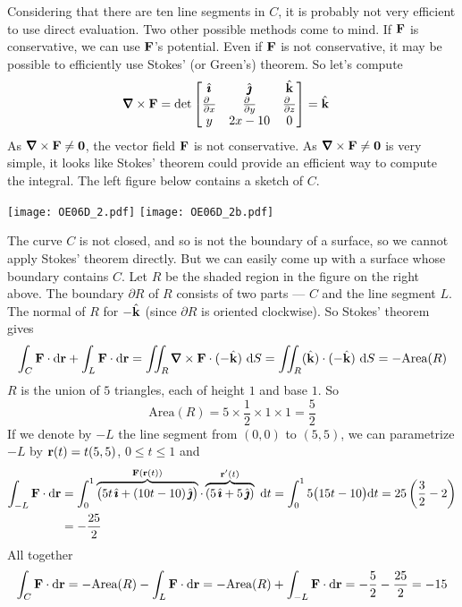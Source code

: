 \begin{solution}
Considering that there are ten line segments in $C$,
it is probably not very efficient to use direct evaluation.
Two other possible methods come to mind. If $\mathbf{F}$ is conservative,
we can use $\mathbf{F}$'s potential. Even if $\mathbf{F}$ is not conservative,
it may be possible to efficiently use Stokes' (or Green's) theorem.
So let's compute
\begin{align*}
\vnabla\times\vF
&=\det\left[\begin{matrix}
\hi &\hj &\hk \\
\tfrac{\partial\hfill}{\partial x} & \tfrac{\partial\hfill}{\partial y} & 
                \tfrac{\partial\hfill}{\partial z} \\
y & 2x-10 & 0
\end{matrix}
\right]
=\hk
\end{align*}
As $\vnabla\times\vF\ne\vZero$, the vector field $\mathbf{F}$ is not conservative.
As $\vnabla\times\vF\ne\vZero$ is very simple, it looks like Stokes'
theorem could provide an efficient way to compute the integral.
The left figure below contains a sketch of $C$.

\begin{center}
       \texttt{[image: OE06D\_2.pdf]}\qquad
       \texttt{[image: OE06D\_2b.pdf]}
\end{center}
The curve $C$ is not closed, and so is not the boundary of a surface,
so we cannot apply Stokes' theorem directly. But we can easily
come up with a surface whose boundary contains $C$. Let $R$ be the shaded
region in the figure on the right above. The boundary $\partial R$ 
of $R$ consists of two parts --- $C$ and the line segment $L$.
The normal of $R$ for $-\hat{\mathbf{k}}$ (since $\partial R$ is oriented clockwise).
So Stokes' theorem gives
\begin{align*}
\int_C \vF \cdot\dee{\vr} + \int_L \vF \cdot\dee{\vr}
= \dblInt_R  \vnabla\times\vF \cdot(-\hk)\ \dee{S}
= \dblInt_R  (\hk) \cdot(-\hk)\ \dee{S}
= -\text{Area}(R)
\end{align*}
$R$ is the union of $5$ triangles, each of height $1$ and base $1$.
So
\begin{equation*}
\text{Area}(R) = 5\times \frac{1}{2}\times 1\times 1
=\frac{5}{2}
\end{equation*}
If we denote by $-L$ the line segment from $(0,0)$ to $(5,5)$,
we can parametrize $-L$ by $\mathbf{r}(t) = t(5,5)$, $0\le t\le 1$ and
\begin{align*}
\int_{-L} \mathbf{F} \cdot\mathrm{d}\mathbf{r}
&=\int_0^1 \overbrace{\big(5t\,\hat{\pmb{\imath}} + (10t-10)\,\hat{\pmb{\jmath}}\big)}^{\mathbf{F}(\mathbf{r}(t))}
              \cdot\overbrace{(5\,\hat{\pmb{\imath}}+5\,\hat{\pmb{\jmath}})}^{\mathbf{r}'(t)}\ \mathrm{d}t
=\int_0^1 5\big(15t-10\big) \mathrm{d}t
=25\left(\frac{3}{2}-2\right) \\
&=-\frac{25}{2}
\end{align*}
All together
\begin{align*}
\int_C \mathbf{F} \cdot\mathrm{d}\mathbf{r} 
= -\text{Area}(R) - \int_L \mathbf{F} \cdot\mathrm{d}\mathbf{r} 
= -\text{Area}(R) + \int_{-L} \mathbf{F} \cdot\mathrm{d}\mathbf{r} 
=-\frac{5}{2}-\frac{25}{2}
=-15
\end{align*}
\end{solution}


